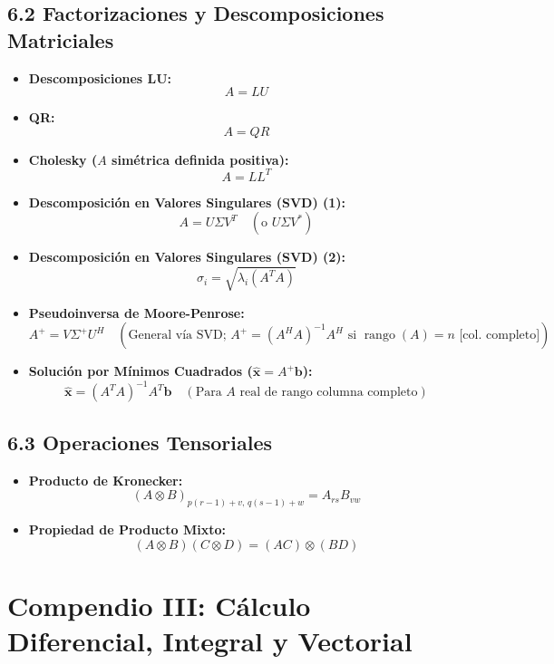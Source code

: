 \documentclass[11pt,a4paper]{article}
\begin{document}
\subsection*{6.2 Factorizaciones y Descomposiciones Matriciales}

\begin{itemize}
  \item \textbf{Descomposiciones LU:}
  \[
    A = LU
  \]
  \item \textbf{QR:}
  \[
    A = QR
  \]
  \item \textbf{Cholesky ($A$ simétrica definida positiva):}
  \[
    A = LL^T
  \]
  \item \textbf{Descomposición en Valores Singulares (SVD) (1):}
  \[
    A = U\Sigma V^T \quad (\text{o } U\Sigma V^*)
  \]
  \item \textbf{Descomposición en Valores Singulares (SVD) (2):}
  \[
    \sigma_i = \sqrt{\lambda_i(A^T A)}
  \]
  \item \textbf{Pseudoinversa de Moore-Penrose:}
  \[
    A^+ = V\Sigma^+ U^H \quad (\text{General vía SVD; } A^+ = (A^H A)^{-1} A^H \text{ si } \operatorname{rango}(A) = n \text{ [col. completo]})
  \]
  \item \textbf{Solución por Mínimos Cuadrados ($\hat{\mathbf{x}} = A^+ \mathbf{b}$):}
  \[
    \hat{\mathbf{x}} = (A^T A)^{-1} A^T \mathbf{b} \quad (\text{Para } A \text{ real de rango columna completo})
  \]
\end{itemize}

\subsection*{6.3 Operaciones Tensoriales}

\begin{itemize}
  \item \textbf{Producto de Kronecker:}
  \[
    (A \otimes B)_{p(r-1)+v, \, q(s-1)+w} = A_{rs} B_{vw}
  \]
  \item \textbf{Propiedad de Producto Mixto:}
  \[
    (A \otimes B)(C \otimes D) = (AC) \otimes (BD)
  \]
\end{itemize}

\section*{Compendio III: Cálculo Diferencial, Integral y Vectorial}
\end{document}
